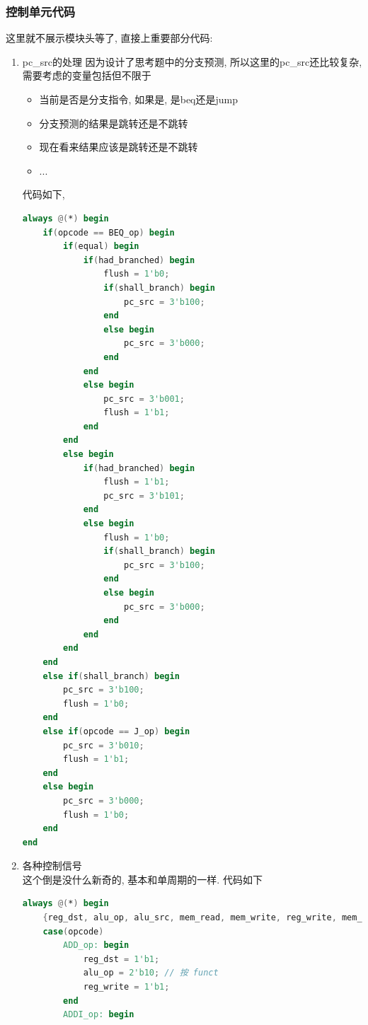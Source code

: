 \documentclass[UTF8]{article}
\begin{document}
\subsubsection{控制单元代码}
这里就不展示模块头等了, 直接上重要部分代码:
\begin{enumerate}
	\item pc\_src的处理
	因为设计了思考题中的分支预测, 所以这里的pc\_src还比较复杂, 需要考虑的变量包括但不限于
	\begin{itemize}
		\item 当前是否是分支指令, 如果是, 是beq还是jump
		\item 分支预测的结果是跳转还是不跳转
		\item 现在看来结果应该是跳转还是不跳转
		\item ...
	\end{itemize}
	代码如下,
	\begin{lstlisting}[language=verilog]
always @(*) begin
    if(opcode == BEQ_op) begin
        if(equal) begin
            if(had_branched) begin
                flush = 1'b0;
                if(shall_branch) begin
                    pc_src = 3'b100;
                end
                else begin
                    pc_src = 3'b000;
                end
            end
            else begin
                pc_src = 3'b001;
                flush = 1'b1;
            end
        end
        else begin
            if(had_branched) begin
                flush = 1'b1;
                pc_src = 3'b101;
            end
            else begin
                flush = 1'b0;
                if(shall_branch) begin
                    pc_src = 3'b100;
                end
                else begin
                    pc_src = 3'b000;
                end
            end
        end
    end
    else if(shall_branch) begin
        pc_src = 3'b100;
        flush = 1'b0;
    end
    else if(opcode == J_op) begin
        pc_src = 3'b010;
        flush = 1'b1;
    end
    else begin
        pc_src = 3'b000;
        flush = 1'b0;
    end
end
	\end{lstlisting}
	\item 各种控制信号\\
	这个倒是没什么新奇的, 基本和单周期的一样. 代码如下
	\begin{lstlisting}[language=verilog]
always @(*) begin
    {reg_dst, alu_op, alu_src, mem_read, mem_write, reg_write, mem_to_reg} = 11'h000;
    case(opcode)
        ADD_op: begin
            reg_dst = 1'b1;
            alu_op = 2'b10; // 按 funct
            reg_write = 1'b1;
        end
        ADDI_op: begin

\end{lstlisting}
\end{enumerate}
\end{document}
